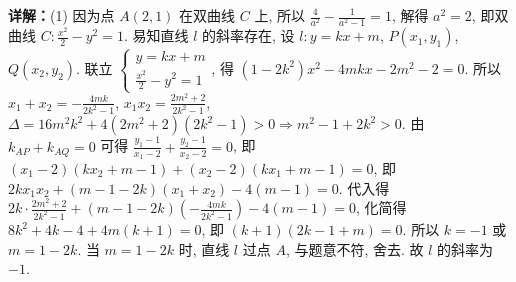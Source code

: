 \begin{question}[points=12]
\begin{solution}
\textbf{详解：}(1) 因为点 $A(2,1)$ 在双曲线 $C$ 上, 所以 $\frac{4}{a^2} - \frac{1}{a^2 - 1} = 1$, 解得 $a^2 = 2$, 即双曲线 $C: \frac{x^2}{2} - y^2 = 1$. 易知直线 $l$ 的斜率存在, 设 $l: y = kx + m$, $P(x_1, y_1)$, $Q(x_2, y_2)$. 联立 $\begin{cases} y = kx + m \\ \frac{x^2}{2} - y^2 = 1 \end{cases}$, 得 $(1 - 2k^2)x^2 - 4mkx - 2m^2 - 2 = 0$. 所以 $x_1 + x_2 = -\frac{4mk}{2k^2 - 1}$, $x_1 x_2 = \frac{2m^2 + 2}{2k^2 - 1}$, $\Delta = 16m^2 k^2 + 4(2m^2 + 2)(2k^2 - 1) > 0 \Rightarrow m^2 - 1 + 2k^2 > 0$. 由 $k_{AP} + k_{AQ} = 0$ 可得 $\frac{y_1 - 1}{x_1 - 2} + \frac{y_2 - 1}{x_2 - 2} = 0$, 即 $(x_1 - 2)(kx_2 + m - 1) + (x_2 - 2)(kx_1 + m - 1) = 0$, 即 $2kx_1 x_2 + (m - 1 - 2k)(x_1 + x_2) - 4(m - 1) = 0$. 代入得 $2k \cdot \frac{2m^2 + 2}{2k^2 - 1} + (m - 1 - 2k)\left(-\frac{4mk}{2k^2 - 1}\right) - 4(m - 1) = 0$, 化简得 $8k^2 + 4k - 4 + 4m(k + 1) = 0$, 即 $(k + 1)(2k - 1 + m) = 0$. 所以 $k = -1$ 或 $m = 1 - 2k$. 当 $m = 1 - 2k$ 时, 直线 $l$ 过点 $A$, 与题意不符, 舍去. 故 $l$ 的斜率为 $-1$.

\end{solution}
\end{question}
